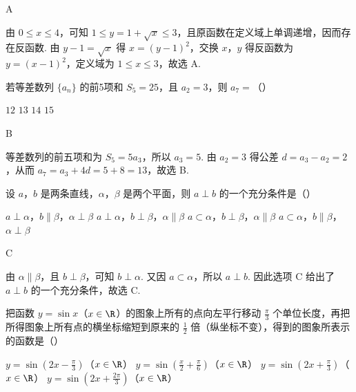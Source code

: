 \begin{answer}
A
\end{answer}

\begin{solution}
由 \(0\leqslant x\leqslant4\)，可知 \(1\leqslant y=1+\sqrt{x}\leqslant3\)，且原函数在定义域上单调递增，因而存在反函数. 由
\(y-1=\sqrt{x}\) 得 \(x=(y-1)^2\)，交换 \(x\)，\(y\) 得反函数为 \(y=(x-1)^2\)，定义域为 \(1\leqslant x\leqslant3\)，故选 A.
\end{solution}

\begin{problem}
若等差数列 \(\{a_{n}\}\) 的前5项和 \(S_{5} = 25\)，且 \(a_{2} = 3\)，则 \(a_{7} =\)（\quad）

\choices
    {\(12\)}
    {\(13\)}
    {\(14\)}
    {\(15\)}
\end{problem}

\begin{answer}
B
\end{answer}

\begin{solution}
等差数列的前五项和为 \(S_5=5a_3\)，所以 \(a_3=5\). 由 \(a_2=3\) 得公差 \(d=a_3-a_2=2\)，从而 \(a_7=a_3+4d=5+8=13\)，故选 B.
\end{solution}

\begin{problem}
设 \(a\)，\(b\) 是两条直线，\(\alpha\)，\(\beta\) 是两个平面，则 \(a \perp b\) 的一个充分条件是（\quad）

\choices
    {\(a \perp \alpha\)，\(b \parallel \beta\)，\(\alpha \perp \beta\)}
    {\(a \perp \alpha\)，\(b \perp \beta\)，\(\alpha \parallel \beta\)}
    {\(a \subset \alpha\)，\(b \perp \beta\)，\(\alpha \parallel \beta\)}
    {\(a \subset \alpha\)，\(b \parallel \beta\)，\(\alpha \perp \beta\)}
\end{problem}

\begin{answer}
C
\end{answer}

\begin{solution}
由 \(\alpha\parallel\beta\)，且 \(b\perp\beta\)，可知 \(b\perp\alpha\). 又因 \(a\subset\alpha\)，所以 \(a\perp b\). 因此选项 C 给出了 \(a\perp b\) 的一个充分条件，故选 C.
\end{solution}

\begin{problem}
把函数 \( y = \sin x \)（\( x \in \R \)）的图象上所有的点向左平行移动 \( \frac{\pi}{3} \) 个单位长度，再把所得图象上所有点的横坐标缩短到原来的 \( \frac{1}{2} \) 倍（纵坐标不变），得到的图象所表示的函数是（\quad）

\choices
    {\( y = \sin \left(2x - \frac{\pi}{3}\right) \)（\(x \in \R\)）}
    {\(y = \sin \left(\frac{x}{2} + \frac{\pi}{6}\right)\)（\(x \in \R\)）}
    {\(y = \sin \left(2x + \frac{\pi}{3}\right)\)（\(x \in \R\)）}
    {\(y = \sin \left(2x + \frac{2\pi}{3}\right)\)（\(x \in \R\)）}
\end{problem}

